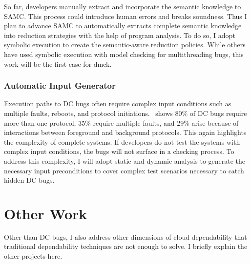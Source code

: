 \documentclass[10pt]{article}
\begin{document}
So far, developers manually extract and incorporate the semantic knowledge to
SAMC. This process could introduce human errors and breaks soundness. Thus I
plan to advance SAMC to automatically extracts complete semantic knowledge into
reduction strategies with the help of program analysis. To do so, I adopt
symbolic execution to create the semantic-aware reduction policies. While others
have used symbolic execution with model checking for multithreading bugs, this
work will be the first case for dmck. 

\subsubsection*{Automatic Input Generator}

Execution paths to DC bugs often require complex input conditions such as
multiple faults, reboots, and protocol initiations. \taxdc\ shows 80\% of DC bugs
require more than one protocol, 35\% require multiple faults, and 29\% arise
because of interactions between foreground and background protocols. This again
highlights the complexity of complete systems. 
If developers do not test the systems with complex input conditions, the bugs
will not surface in a checking process. To address this complexity, I will adopt
static and dynamic analysis to generate the necessary input preconditions to
cover complex test scenarios necessary to catch hidden DC bugs.

\section{Other Work}

Other than DC bugs, I also address other dimensions of cloud dependability that
traditional dependability techniques are not enough to solve. I briefly explain
the other projects here.

%

\end{document}
